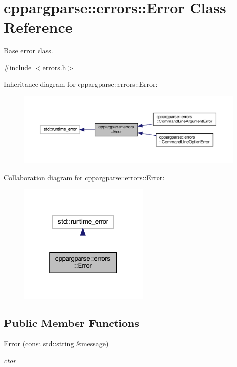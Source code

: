 \hypertarget{classcppargparse_1_1errors_1_1Error}{}\section{cppargparse\+:\+:errors\+:\+:Error Class Reference}
\label{classcppargparse_1_1errors_1_1Error}


Base error class.  




{\ttfamily \#include $<$errors.\+h$>$}



Inheritance diagram for cppargparse\+:\+:errors\+:\+:Error\+:
\nopagebreak
\begin{figure}[H]
\begin{center}
\leavevmode
\includegraphics[width=350pt]{classcppargparse_1_1errors_1_1Error__inherit__graph}
\end{center}
\end{figure}


Collaboration diagram for cppargparse\+:\+:errors\+:\+:Error\+:
\nopagebreak
\begin{figure}[H]
\begin{center}
\leavevmode
\includegraphics[width=181pt]{classcppargparse_1_1errors_1_1Error__coll__graph}
\end{center}
\end{figure}
\subsection*{Public Member Functions}
\begin{DoxyCompactItemize}
\item 
\hyperlink{classcppargparse_1_1errors_1_1Error_a41c12888d001504fbaec210c5574b91a}{Error} (const std\+::string \&message)
\begin{DoxyCompactList}\small\item\em c\textquotesingle{}tor \end{DoxyCompactList}\end{DoxyCompactItemize}


